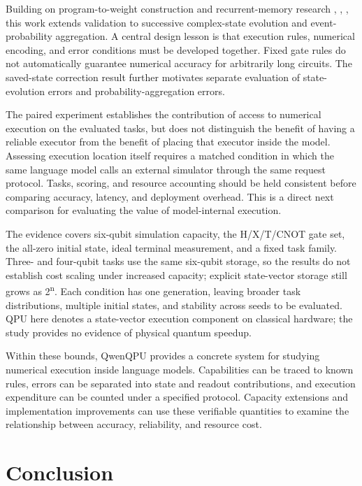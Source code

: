 \documentclass[11pt,a4paper]{article}
\begin{document}
Building on program-to-weight construction and recurrent-memory research \cite{ref5}, \cite{ref6}, \cite{ref13}, this work extends validation to successive complex-state evolution and event-probability aggregation. A central design lesson is that execution rules, numerical encoding, and error conditions must be developed together. Fixed gate rules do not automatically guarantee numerical accuracy for arbitrarily long circuits. The saved-state correction result further motivates separate evaluation of state-evolution errors and probability-aggregation errors.

The paired experiment establishes the contribution of access to numerical execution on the evaluated tasks, but does not distinguish the benefit of having a reliable executor from the benefit of placing that executor inside the model. Assessing execution location itself requires a matched condition in which the same language model calls an external simulator through the same request protocol. Tasks, scoring, and resource accounting should be held consistent before comparing accuracy, latency, and deployment overhead. This is a direct next comparison for evaluating the value of model-internal execution.

The evidence covers six-qubit simulation capacity, the H/X/T/CNOT gate set, the all-zero initial state, ideal terminal measurement, and a fixed task family. Three- and four-qubit tasks use the same six-qubit storage, so the results do not establish cost scaling under increased capacity; explicit state-vector storage still grows as 2\textsuperscript{n}. Each condition has one generation, leaving broader task distributions, multiple initial states, and stability across seeds to be evaluated. QPU here denotes a state-vector execution component on classical hardware; the study provides no evidence of physical quantum speedup.

Within these bounds, QwenQPU provides a concrete system for studying numerical execution inside language models. Capabilities can be traced to known rules, errors can be separated into state and readout contributions, and execution expenditure can be counted under a specified protocol. Capacity extensions and implementation improvements can use these verifiable quantities to examine the relationship between accuracy, reliability, and resource cost.

\section{Conclusion}
\end{document}
